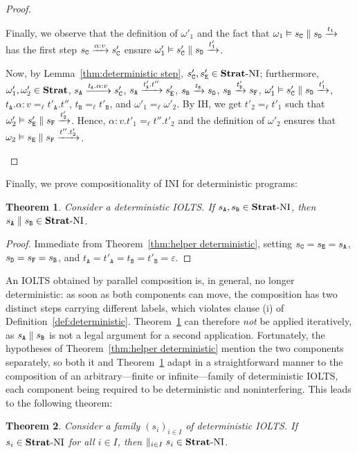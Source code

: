 \documentclass[preprint,5p,twocolumn]{elsarticle}
\newtheorem{theorem}{Theorem}
\begin{document}
\begin{proof}
\begin{itemize}
    Finally, we observe that the definition of $\omega'_1$ and the fact that $\omega_1 \vDash s_{\mathtt{C}} \parallel s_{\mathtt{D}} \xrightarrow{t_1}$
    has the first step $s_{\mathtt{C}} \xrightarrow{\alpha:v} s_{\mathtt{C}}'$  ensure $\omega'_1 \vDash s_{\mathtt{C}}' \parallel s_{\mathtt{D}} \xrightarrow{t'_1}$.

    Now, by Lemma~\ref{thm:deterministic step}, $s_{\mathtt{C}}', s_{\mathtt{E}}' \in \mathbf{Strat}\text{-}\mathrm{NI}$; furthermore,
    $\omega'_1,\omega'_2 \in \mathbf{Strat}$,
    $s_{\mathtt{A}} \xrightarrow{t_{\mathtt{A}}.\alpha:v} s_{\mathtt{C}}'$, $s_{\mathtt{A}} \xrightarrow{t'_{\mathtt{A}}.t''} s_{\mathtt{E}}'$,
    $s_{\mathtt{B}} \xrightarrow{t_{\mathtt{B}}} s_{\mathtt{D}}$, $s_{\mathtt{B}} \xrightarrow{t'_{\mathtt{B}}} s_{\mathtt{F}}$,
    $\omega'_1 \vDash s_{\mathtt{C}}' \parallel s_{\mathtt{D}} \xrightarrow{t'_1}$,
    $t_{\mathtt{A}}.\alpha:v =_\ell t'_{\mathtt{A}}.t''$, $t_{\mathtt{B}} =_\ell t'_{\mathtt{B}}$,
    and $\omega'_1 =_\ell \omega'_2$.
    By IH, we get $t'_2 =_\ell t'_1$ such that
    $\omega'_2 \vDash s_{\mathtt{E}}' \parallel s_{\mathtt{F}} \xrightarrow{t'_2}$. Hence, $\alpha:v.t'_1 =_\ell t''.t'_2$
    and the definition of $\omega'_2$ ensures that $\omega_2 \vDash s_{\mathtt{E}} \parallel s_{\mathtt{F}} \xrightarrow{t''.t'_2}$.
  \end{itemize}
\end{proof}

Finally, we prove compositionality of INI for deterministic programs:

\begin{theorem}
  \label{thm:deterministic}
  Consider a deterministic IOLTS. If $s_{\mathtt{A}}, s_{\mathtt{B}} \in \mathbf{Strat}\text{-}\mathrm{NI}$, then $s_{\mathtt{A}} \parallel s_{\mathtt{B}} \in \mathbf{Strat}\text{-}\mathrm{NI}$.
\end{theorem}
\begin{proof}
  Immediate from Theorem~\ref{thm:helper deterministic}, setting $s_{\mathtt{C}} = s_{\mathtt{E}} = s_{\mathtt{A}}$, $s_{\mathtt{D}} = s_{\mathtt{F}} = s_{\mathtt{B}}$,
  and $t_{\mathtt{A}} = t'_{\mathtt{A}} = t_{\mathtt{B}} = t'_{\mathtt{B}} = \varepsilon$.
\end{proof}

An IOLTS obtained by parallel composition is, in general, no longer deterministic: as soon as both
components can move, the composition has two distinct steps carrying different labels, which
violates clause (i) of Definition~\ref{def:deterministic}. Theorem~\ref{thm:deterministic} can
therefore \emph{not} be applied iteratively, as $s_{\mathtt{A}} \parallel s_{\mathtt{B}}$ is not a legal argument for a
second application. Fortunately, the hypotheses of Theorem~\ref{thm:helper deterministic} mention
the two components separately, so both it and Theorem~\ref{thm:deterministic} adapt in a
straightforward manner to the composition of an arbitrary---finite or infinite---family of
deterministic IOLTS, each component being required to be deterministic and noninterfering. This
leads to the following theorem:
\begin{theorem}
  \label{thm:deterministic family}
  Consider a family $(s_i)_{i\in I}$ of deterministic IOLTS. If $s_i \in \mathbf{Strat}\text{-}\mathrm{NI}$ for all $i \in I$, then $\parallel_{i \in I} s_i \in \mathbf{Strat}\text{-}\mathrm{NI}$.
\end{theorem}
\end{document}
